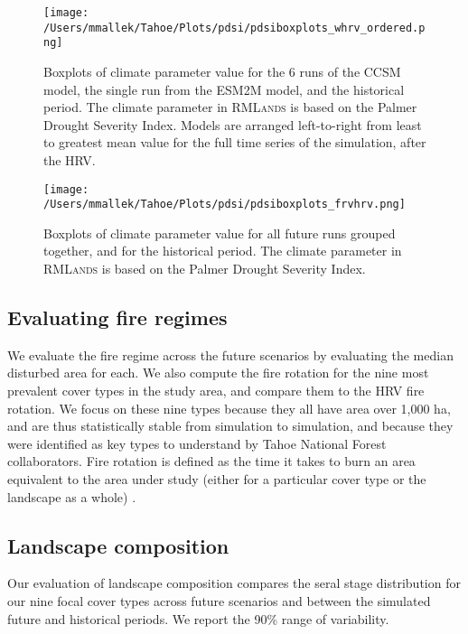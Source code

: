 \documentclass[12pt]{article}
\begin{document}
\begin{spacing}{1}
\begin{figure}[!htbp]
\centering
\texttt{[image: /Users/mmallek/Tahoe/Plots/pdsi/pdsiboxplots\_whrv\_ordered.png]}
\caption{Boxplots of climate parameter value for the 6 runs of the CCSM model, the single run from the ESM2M model, and the historical period.  The climate parameter in \textsc{RMLands} is based on the Palmer Drought Severity Index. Models are arranged left-to-right from least to greatest mean value for the full time series of the simulation, after the HRV.}
\label{pdsi-boxplots}
\end{figure}

\begin{figure}[!htbp]
\centering
\texttt{[image: /Users/mmallek/Tahoe/Plots/pdsi/pdsiboxplots\_frvhrv.png]}
\caption{Boxplots of climate parameter value for all future runs grouped together, and for the historical period. The climate parameter in \textsc{RMLands} is based on the Palmer Drought Severity Index.}
\label{pdsi-boxplots-frvhrv}
\end{figure}

\subsection*{Evaluating fire regimes}
We evaluate the fire regime across the future scenarios by evaluating the median disturbed area for each. We also compute the fire rotation for the nine most prevalent cover types in the study area, and compare them to the HRV fire rotation. We focus on these nine types because they all have area over 1,000 ha, and are thus statistically stable from simulation to simulation, and because they were identified as key types to understand by Tahoe National Forest collaborators. Fire rotation is defined as the time it takes to burn an area equivalent to the area under study (either for a particular cover type or the landscape as a whole) \citep{Agee1993}.


\subsection*{Landscape composition}
Our evaluation of landscape composition compares the seral stage distribution for our nine focal cover types across future scenarios and between the simulated future and historical periods. We report the 90\% range of variability.



\end{spacing}
\end{document}
